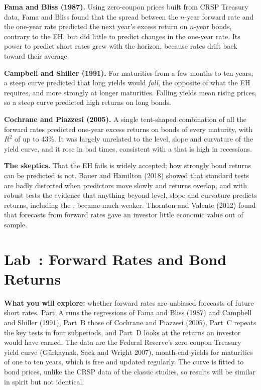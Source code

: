 \textbf{Fama and Bliss (1987).} Using zero-coupon prices built from CRSP Treasury data, Fama and Bliss found that the spread between the $n$-year forward rate and the one-year rate predicted the next year's excess return on $n$-year bonds, contrary to the EH, but did little to predict changes in the one-year rate. Its power to predict short rates grew with the horizon, because rates drift back toward their average.

\textbf{Campbell and Shiller (1991).} For maturities from a few months to ten years, a steep curve predicted that long yields would \emph{fall}, the opposite of what the EH requires, and more strongly at longer maturities. Falling yields mean rising prices, so a steep curve predicted high returns on long bonds.

\textbf{Cochrane and Piazzesi (2005).} A single tent-shaped combination of all the forward rates predicted one-year excess returns on bonds of every maturity, with $R^2$ of up to 43\%. It was largely unrelated to the level, slope and curvature of the yield curve, and it rose in bad times, consistent with a  that is high in recessions.

\textbf{The skeptics.} That the EH fails is widely accepted; how strongly bond returns can be predicted is not. Bauer and Hamilton (2018) showed that standard tests are badly distorted when predictors move slowly and returns overlap, and with robust tests the evidence that anything beyond level, slope and curvature predicts returns, including the , became much weaker. Thornton and Valente (2012) found that forecasts from forward rates gave an investor little economic value out of sample.

\section{Lab~\thechapter: Forward Rates and Bond Returns}
\label{sec:07-lab}

\textbf{What you will explore:} whether forward rates are unbiased forecasts of future short rates. Part~A runs the regressions of Fama and Bliss (1987) and Campbell and Shiller (1991), Part~B those of Cochrane and Piazzesi (2005), Part~C repeats the key tests in four subperiods, and Part~D looks at the returns an investor would have earned. The data are the Federal Reserve's zero-coupon Treasury yield curve (G\"urkaynak, Sack and Wright 2007), month-end yields for maturities of one to ten years, which is free and updated regularly. The curve is fitted to bond prices, unlike the CRSP data of the classic studies, so results will be similar in spirit but not identical.

